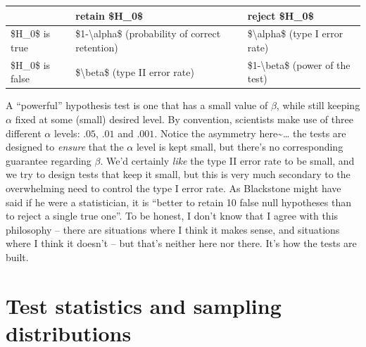 \documentclass[
]{book}
\begin{document}
\begin{tabular}{l|l|l}
\hline
 & retain \$H\_0\$ & reject \$H\_0\$\\
\hline
\$H\_0\$ is true & \$1-\textbackslash{}alpha\$ (probability of correct retention) & \$\textbackslash{}alpha\$ (type I error rate)\\
\hline
\$H\_0\$ is false & \$\textbackslash{}beta\$ (type II error rate) & \$1-\textbackslash{}beta\$  (power of the test)\\
\hline
\end{tabular}

A ``powerful'' hypothesis test is one that has a small value of \(\beta\), while still keeping \(\alpha\) fixed at some (small) desired level. By convention, scientists make use of three different \(\alpha\) levels: \(.05\), \(.01\) and \(.001\). Notice the asymmetry here\textasciitilde\ldots{} the tests are designed to \emph{ensure} that the \(\alpha\) level is kept small, but there's no corresponding guarantee regarding \(\beta\). We'd certainly \emph{like} the type II error rate to be small, and we try to design tests that keep it small, but this is very much secondary to the overwhelming need to control the type I error rate. As Blackstone might have said if he were a statistician, it is ``better to retain 10 false null hypotheses than to reject a single true one''. To be honest, I don't know that I agree with this philosophy -- there are situations where I think it makes sense, and situations where I think it doesn't -- but that's neither here nor there. It's how the tests are built.

\hypertarget{teststatistics}{%
\section{Test statistics and sampling distributions}\label{teststatistics}}
\end{document}
